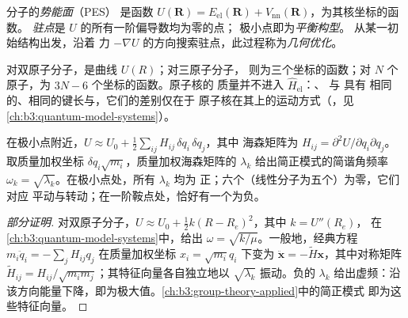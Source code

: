 \begin{definition}\label{def:b3:computational-chemistry:pes}
分子的\emph{势能面}（PES）
是函数 $U(\mathbf R) = E_{\mathrm{el}}(\mathbf R) +
V_{\mathrm{nn}}(\mathbf R)$，为其核坐标的函数。
\emph{驻点}是 $U$ 的所有一阶偏导数均为零的点；
极小点即为\emph{平衡构型}。
从某一初始结构出发，沿着
力 $-\nabla U$ 的方向搜索驻点，此过程称为\emph{几何优化}。
\end{definition}

对双原子分子，是曲线 $U(R)$；对三原子分子，
则为三个坐标的函数；对 $N$ 个原子，为 $3N - 6$ 个坐标的函数。原子核的
质量并不进入 $\hat H_{\mathrm{el}}$：、 与  具有
相同的、相同的键长与，它们的差别仅在于
原子核在其上的运动方式（，见\cref{ch:b3:quantum-model-systems}）。

\begin{proposition}[由海森矩阵求频率]\label{prop:b3:computational-chemistry:hessian}
在极小点附近，$U \approx U_0 + \frac12\sum_{ij}H_{ij}\,\delta q_i\,\delta q_j$，其中
海森矩阵为 $H_{ij} = \partial^2U/\partial q_i\partial q_j$。取质量加权坐标
$\delta q_i\sqrt{m_i}$，质量加权海森矩阵的
 $\lambda_k$ 给出简正模式的简谐角频率 $\omega_k =
\sqrt{\lambda_k}$。在极小点处，所有 $\lambda_k$ 均为
正；六个（线性分子为五个）为零，它们对应
平动与转动；在一阶鞍点处，恰好有一个为负。
\end{proposition}

\begin{proof}[部分证明]
对双原子分子，$U \approx U_0 + \frac12k(R - R_e)^2$，其中 $k = U''(R_e)$，
在\cref{ch:b3:quantum-model-systems}中，给出 $\omega =
\sqrt{k/\mu}$。一般地，经典方程 $m_i\ddot q_i =
-\sum_jH_{ij}q_j$ 在质量加权坐标 $x_i = \sqrt{m_i}q_i$ 下变为
$\ddot{\mathbf x} = -\tilde H\mathbf x$，其中对称矩阵 $\tilde H_{ij} =
H_{ij}/\sqrt{m_im_j}$；其特征向量各自独立地以
$\sqrt{\lambda_k}$ 振动。负的 $\lambda_k$ 给出虚频：沿
该方向能量下降，即为极大值。\cref{ch:b3:group-theory-applied}中的简正模式
即为这些特征向量。
\end{proof}

